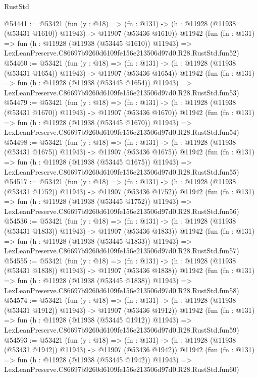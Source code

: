 \begin{lexlean}{RustStd}
\begin{coremodule}
@54441 := @53421
    (fun (y : @18) =>
    (fn : @131) -> (h : @11928 (@11938 (@53431 @1610)) @11943) -> @11907 (@53436 @1610))
    @11942
    (fun (fn : @131) =>
    fun (h : @11928 (@11938 (@53445 @1610)) @11943) =>
    LexLeanPreserve.C86697b9260d6109fe156e213506d97d0.R28.RustStd.fun52)
@54460 := @53421
    (fun (y : @18) =>
    (fn : @131) -> (h : @11928 (@11938 (@53431 @1654)) @11943) -> @11907 (@53436 @1654))
    @11942
    (fun (fn : @131) =>
    fun (h : @11928 (@11938 (@53445 @1654)) @11943) =>
    LexLeanPreserve.C86697b9260d6109fe156e213506d97d0.R28.RustStd.fun53)
@54479 := @53421
    (fun (y : @18) =>
    (fn : @131) -> (h : @11928 (@11938 (@53431 @1670)) @11943) -> @11907 (@53436 @1670))
    @11942
    (fun (fn : @131) =>
    fun (h : @11928 (@11938 (@53445 @1670)) @11943) =>
    LexLeanPreserve.C86697b9260d6109fe156e213506d97d0.R28.RustStd.fun54)
@54498 := @53421
    (fun (y : @18) =>
    (fn : @131) -> (h : @11928 (@11938 (@53431 @1675)) @11943) -> @11907 (@53436 @1675))
    @11942
    (fun (fn : @131) =>
    fun (h : @11928 (@11938 (@53445 @1675)) @11943) =>
    LexLeanPreserve.C86697b9260d6109fe156e213506d97d0.R28.RustStd.fun55)
@54517 := @53421
    (fun (y : @18) =>
    (fn : @131) -> (h : @11928 (@11938 (@53431 @1752)) @11943) -> @11907 (@53436 @1752))
    @11942
    (fun (fn : @131) =>
    fun (h : @11928 (@11938 (@53445 @1752)) @11943) =>
    LexLeanPreserve.C86697b9260d6109fe156e213506d97d0.R28.RustStd.fun56)
@54536 := @53421
    (fun (y : @18) =>
    (fn : @131) -> (h : @11928 (@11938 (@53431 @1833)) @11943) -> @11907 (@53436 @1833))
    @11942
    (fun (fn : @131) =>
    fun (h : @11928 (@11938 (@53445 @1833)) @11943) =>
    LexLeanPreserve.C86697b9260d6109fe156e213506d97d0.R28.RustStd.fun57)
@54555 := @53421
    (fun (y : @18) =>
    (fn : @131) -> (h : @11928 (@11938 (@53431 @1838)) @11943) -> @11907 (@53436 @1838))
    @11942
    (fun (fn : @131) =>
    fun (h : @11928 (@11938 (@53445 @1838)) @11943) =>
    LexLeanPreserve.C86697b9260d6109fe156e213506d97d0.R28.RustStd.fun58)
@54574 := @53421
    (fun (y : @18) =>
    (fn : @131) -> (h : @11928 (@11938 (@53431 @1912)) @11943) -> @11907 (@53436 @1912))
    @11942
    (fun (fn : @131) =>
    fun (h : @11928 (@11938 (@53445 @1912)) @11943) =>
    LexLeanPreserve.C86697b9260d6109fe156e213506d97d0.R28.RustStd.fun59)
@54593 := @53421
    (fun (y : @18) =>
    (fn : @131) -> (h : @11928 (@11938 (@53431 @1942)) @11943) -> @11907 (@53436 @1942))
    @11942
    (fun (fn : @131) =>
    fun (h : @11928 (@11938 (@53445 @1942)) @11943) =>
    LexLeanPreserve.C86697b9260d6109fe156e213506d97d0.R28.RustStd.fun60)

\end{coremodule}
\end{lexlean}
